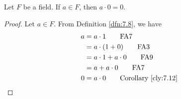 \documentclass[../main.tex]{subfiles}
\begin{document}
\begin{corollary}\label{cly:7.13}
    Let $F$ be a field. If $a\in F$, then $a\cdot 0=0$.
    \begin{proof}
        Let $a\in F$. From Definition \ref{dfn:7.8}, we have
        \begin{align*}
            a &= a\cdot 1\tag*{FA7}\\
            &= a\cdot(1+0)\tag*{FA3}\\
            &= a\cdot 1+a\cdot 0\tag*{FA9}\\
            &= a+a\cdot 0\tag*{FA7}\\
            0 &= a\cdot 0\tag*{Corollary \ref{cly:7.12}}
        \end{align*}
    \end{proof}
\end{corollary}
\end{document}
